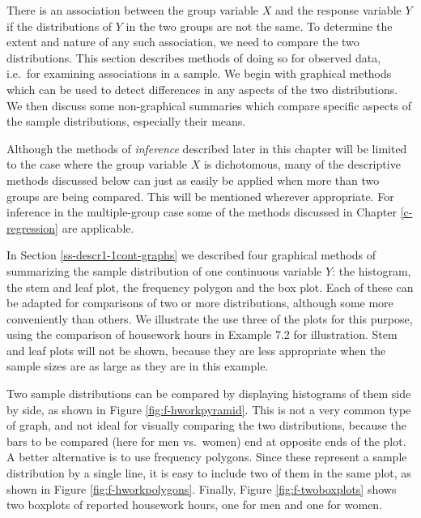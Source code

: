 \documentclass[11pt,a4paper,openany]{book}
\begin{document}
There is an association between the group variable \(X\) and the
response variable \(Y\) if the distributions of \(Y\) in the two groups
are not the same. To determine the extent and nature of any such
association, we need to compare the two distributions. This section
describes methods of doing so for observed data, i.e.~for examining
associations in a sample. We begin with graphical methods which can be
used to detect differences in any aspects of the two distributions. We
then discuss some non-graphical summaries which compare specific aspects
of the sample distributions, especially their means.

Although the methods of \emph{inference} described later in this chapter
will be limited to the case where the group variable \(X\) is
dichotomous, many of the descriptive methods discussed below can just as
easily be applied when more than two groups are being compared. This
will be mentioned wherever appropriate. For inference in the
multiple-group case some of the methods discussed in Chapter
\ref{c-regression} are applicable.

In Section \ref{ss-descr1-1cont-graphs} we described four graphical
methods of summarizing the sample distribution of one continuous
variable \(Y\): the histogram, the stem and leaf plot, the frequency
polygon and the box plot. Each of these can be adapted for comparisons
of two or more distributions, although some more conveniently than
others. We illustrate the use three of the plots for this purpose, using
the comparison of housework hours in Example 7.2 for illustration. Stem
and leaf plots will not be shown, because they are less appropriate when
the sample sizes are as large as they are in this example.

Two sample distributions can be compared by displaying histograms of
them side by side, as shown in Figure \ref{fig:f-hworkpyramid}. This is
not a very common type of graph, and not ideal for visually comparing
the two distributions, because the bars to be compared (here for men
vs.~women) end at opposite ends of the plot. A better alternative is to
use frequency polygons. Since these represent a sample distribution by a
single line, it is easy to include two of them in the same plot, as
shown in Figure \ref{fig:f-hworkpolygons}. Finally, Figure
\ref{fig:f-twoboxplots} shows two boxplots of reported housework hours,
one for men and one for women.
\end{document}
